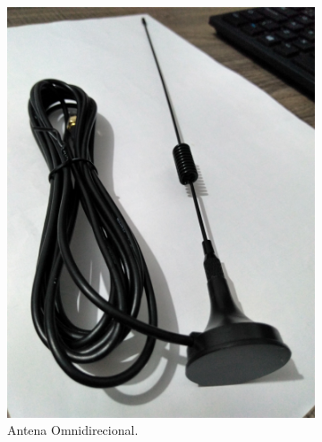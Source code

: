 \documentclass[
  12pt,				%
  openright,			%
  twoside,			%
  a4paper,			%
  english,			%
  french,				%
  spanish,			%
  brazil,				%
  ]{abntex2}
\begin{document}
\begin{figure}[!htb]
\begin{subfigure}[b]{0.45\linewidth}
    \includegraphics[width=\linewidth]{figures/hackrf/hack_rf_antena_helicoidal.jpg}
    \caption{Antena Omnidirecional.}
    \label{fig:hack_rf_antena_helicoidal}
  \end{subfigure}
  \quad
  \begin{subfigure}[b]{0.45\linewidth}
    \centering

\end{subfigure}
\end{figure}
\end{document}
